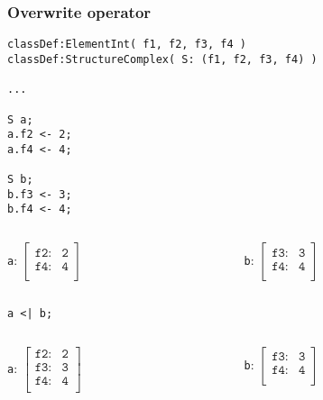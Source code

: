\documentclass[11pt]{beamer}
\begin{document}
\begin{frame}[fragile]
\frametitle{Overwrite operator}
\scriptsize
\begin{lstlisting}[language=lekta]
classDef:ElementInt( f1, f2, f3, f4 )
classDef:StructureComplex( S: (f1, f2, f3, f4) )

...

S a;
a.f2 <- 2;
a.f4 <- 4;

S b;
b.f3 <- 3;
b.f4 <- 4;
\end{lstlisting}
\small
\vspace{-10pt}
\begin{columns}
	\begin{column}{0.5\textwidth}
		\begin{center}
			\texttt{a}: $\begin{bmatrix}
																				\texttt{f2:}      & \texttt{2}\\ 
																				\texttt{f4:}     	& \texttt{4}\\ 
																			\end{bmatrix}$
		\end{center}
	\end{column}
	\begin{column}{0.5\textwidth}
		\begin{center}
			\texttt{b}: $\begin{bmatrix}
																				\texttt{f3:}      & \texttt{3}\\ 
																				\texttt{f4:}     	& \texttt{4}\\ 
																			\end{bmatrix}$
		\end{center}
	\end{column}
\end{columns}
\begin{center}
\texttt{a <| b;}
\end{center}
\vspace{-30pt}
\begin{columns}
	\begin{column}{0.5\textwidth}
		\begin{center}
			\texttt{a}: $\begin{bmatrix}
																				\texttt{f2:}      & \texttt{2}\\ 
																				\texttt{f3:}      & \texttt{3}\\ 
																				\texttt{f4:}     	& \texttt{4}\\ 
																			\end{bmatrix}$
		\end{center}
	\end{column}
	\begin{column}{0.5\textwidth}
		\begin{center}
			\texttt{b}: $\begin{bmatrix}
																				\texttt{f3:}      & \texttt{3}\\ 
																				\texttt{f4:}     	& \texttt{4}\\ 
																			\end{bmatrix}$
		\end{center}
	\end{column}
\end{columns}
\end{frame}
\end{document}
